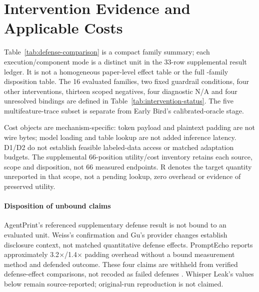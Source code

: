 \section{Intervention Evidence and Applicable Costs}
\label{app:defense-comparison}
Table~\ref{tab:defense-comparison} is a compact family summary; each execution/component mode is a distinct unit in the 33-row supplemental result ledger. It is not a homogeneous paper-level effect table or the full \FinalCore{}-family disposition table. The 16 evaluated families, two fixed guardrail conditions, four other interventions, thirteen scoped negatives, four diagnostic N/A and four unresolved bindings are defined in Table~\ref{tab:intervention-status}. The five multifeature-trace subset is separate from Early Bird's calibrated-oracle stage.

Cost objects are mechanism-specific: token payload and plaintext padding are not wire bytes; model loading and table lookup are not added inference latency. D1/D2 do not establish feasible labeled-data access or matched adaptation budgets. The supplemental 66-position utility/cost inventory retains each source, scope and disposition, not 66 measured endpoints. R denotes the target quantity unreported in that scope, not a pending lookup, zero overhead or evidence of preserved utility.

\paragraph{Disposition of unbound claims}
AgentPrint's referenced supplementary defense result is not bound to an evaluated unit. Weiss's confirmation and Gu's provider changes establish disclosure context, not matched quantitative defense effects. PromptEcho reports approximately 3.2$\times$/1.4$\times$ padding overhead without a bound measurement method and defended outcome. These four claims are withheld from verified defense-effect comparisons, not recoded as failed defenses \cite{agentprint2025,weiss2024prompt,gu2025promptcaching,prompt_echo2026}. Whisper Leak's values below remain source-reported; original-run reproduction is not claimed.

